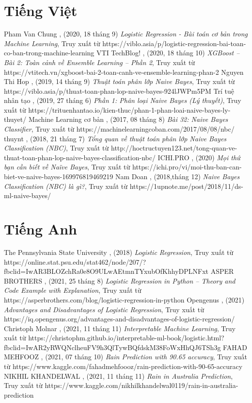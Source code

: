 \documentclass{article}
\begin{document}
\section*{Tiếng Việt}
\begin{thebibliography}{99}
	\bibitem{} Pham Van Chung , (2020, 18 tháng 9) \textit{Logistic Regression - Bài toán cơ bản trong Machine Learning}, Truy xuất từ https://viblo.asia/p/logistic-regression-bai-toan-co-ban-trong-machine-learning
	\bibitem{} VTI TechBlog! , (2020, 18 tháng 10) \textit{XGBoost – Bài 2: Toàn cảnh về Ensemble Learning – Phần 2}, Truy xuất từ https://vtitech.vn/xgboost-bai-2-toan-canh-ve-ensemble-learning-phan-2
	\bibitem{} Nguyen Thi Hop , (2019, 14 tháng 9) \textit{Thuật toán phân lớp Naive Bayes}, Truy xuất từ https://viblo.asia/p/thuat-toan-phan-lop-naive-bayes-924lJWPm5PM
	\bibitem{} Trí tuệ nhân tạo , (2019, 27 tháng 6) \textit{Phần 1: Phân loại Naive Bayes (Lý thuyết)}, Truy xuất từ https://trituenhantao.io/kien-thuc/phan-1-phan-loai-naive-bayes-ly-thuyet/
	\bibitem{} Machine Learning cơ bản , (2017, 08 tháng 8) \textit{Bài 32: Naive Bayes Classifier}, Truy xuất từ https://machinelearningcoban.com/2017/08/08/nbc/
	\bibitem{} thuynt , (2018, 21 tháng 7) \textit{Tổng quan về thuật toán phân lớp Naive Bayes Classification (NBC)}, Truy xuất từ http://hoctructuyen123.net/tong-quan-ve-thuat-toan-phan-lop-naive-bayes-classification-nbc/
	\bibitem{} ICHI.PRO , (2020) \textit{Mọi thứ bạn cần biết về Naïve Bayes}, Truy xuất từ https://ichi.pro/vi/moi-thu-ban-can-biet-ve-naive-bayes-169976819469219
	\bibitem{} Nam Doan , (2018,tháng 12) \textit{Naive Bayes Classification (NBC) là gì?}, Truy xuất từ https://1upnote.me/post/2018/11/ds-ml-naive-bayes/
	\end{thebibliography}
\section*{Tiếng Anh}
\begin{thebibliography}{99}
	\bibitem{} The Pennsylvania State University , (2018) \textit{Logistic Regression}, Truy xuất từ https://online.stat.psu.edu/stat462/node/207/?fbclid=IwAR3BLOZchRa0e8O9ULwAEtmnTYxubOfKhhyDPLNFxt
    \bibitem{} ASPER BROTHERS , (2021, 25 tháng 8) \textit{Logistic Regression in Python – Theory and Code Example with Explanation}, Truy xuất từ https://asperbrothers.com/blog/logistic-regression-in-python
    \bibitem{} Opengenus , (2021) \textit{Advantages and Disadvantages of Logistic Regression}, Truy xuất từ https://iq.opengenus.org/advantages-and-disadvantages-of-logistic-regression/
    \bibitem{} Christoph Molnar , (2021, 11 tháng 11) \textit{Interpretable Machine Learning}, Truy xuất từ https://christophm.github.io/interpretable-ml-book/logistic.html?fbclid=IwAR2yRWQNclheuFV9h3QlTywBQfdskM38FoWxHhQJ6TSh3g
    \bibitem{} FAHAD MEHFOOZ , (2021, 07 tháng 10) \textit{Rain Prediction with 90.65 accuracy}, Truy xuất từ https://www.kaggle.com/fahadmehfoooz/rain-prediction-with-90-65-accuracy
    \bibitem{} NIKHIL KHANDELWAL , (2021, 11 tháng 11) \textit{Rain in Australia Prediction}, Truy xuất từ https://www.kaggle.com/nikhilkhandelwal0119/rain-in-australia-prediction
    \end{thebibliography}
\end{document}
